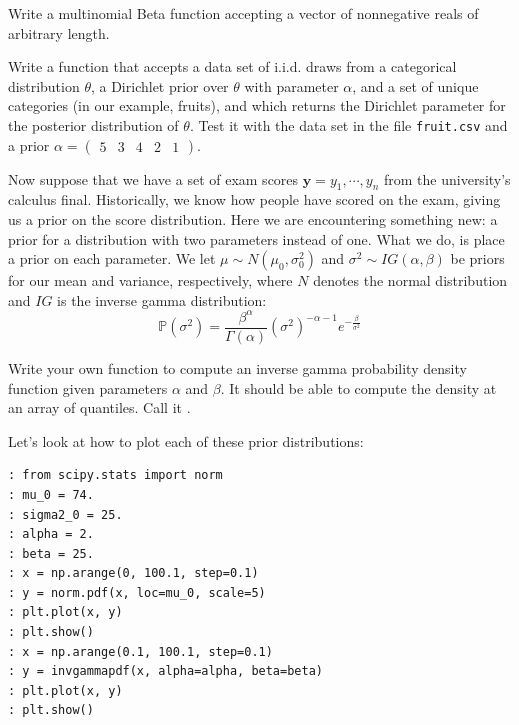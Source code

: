 \begin{problem}
Write a multinomial Beta function accepting a vector of nonnegative reals of arbitrary length.
\end{problem}

\begin{problem}
Write a function that accepts a data set of i.i.d. draws from a categorical distribution $\theta$, a Dirichlet prior over $\theta$ with parameter $\alpha$, and a set of unique categories (in our example, fruits), and which returns the Dirichlet parameter for the posterior distribution of $\theta$. Test it with the data set in the file \texttt{fruit.csv} and a prior $\alpha = \left( \begin{array}{ccccc} 5 & 3 & 4 & 2 & 1 \end{array} \right)$.
\end{problem}

Now suppose that we have a set of exam scores $\mathbf{y} = y_{1}, \cdots, y_{n}$ from the university's calculus final. Historically, we know how people have scored on the exam, giving us a prior on the score distribution. Here we are encountering something new: a prior for a distribution with two parameters instead of one. What we do, is place a prior on each parameter. We let $\mu \sim N(\mu_{0}, \sigma_{0}^{2})$ and $\sigma^{2} \sim IG(\alpha, \beta)$ be priors for our mean and variance, respectively, where $N$ denotes the normal distribution and $IG$ is the inverse gamma distribution:
\begin{equation*}
\mathbb{P}(\sigma^{2}) = \frac{\beta^{\alpha}}{\Gamma(\alpha)}(\sigma^{2})^{-\alpha - 1}e^{-\frac{\beta}{\sigma^{2}}}
\end{equation*}


\begin{problem}
Write your own function to compute an inverse gamma probability density function given parameters $\alpha$ and $\beta$. It should be able to compute the density at an array of quantiles. Call it .
\end{problem}

Let's look at how to plot each of these prior distributions:
\begin{lstlisting}
: from scipy.stats import norm
: mu_0 = 74.
: sigma2_0 = 25.
: alpha = 2.
: beta = 25.
: x = np.arange(0, 100.1, step=0.1)
: y = norm.pdf(x, loc=mu_0, scale=5)
: plt.plot(x, y)
: plt.show()
: x = np.arange(0.1, 100.1, step=0.1)
: y = invgammapdf(x, alpha=alpha, beta=beta)
: plt.plot(x, y)
: plt.show()
\end{lstlisting}

